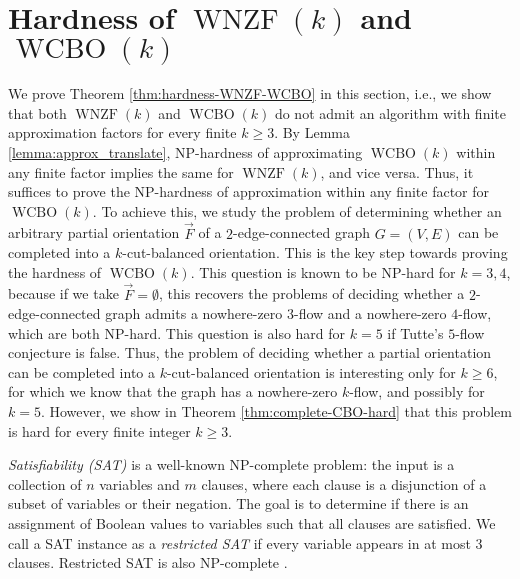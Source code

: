 \documentclass[11pt]{article}
\begin{document}
\section{Hardness of $\operatorname{WNZF}(k)$ and $\operatorname{WCBO}(k)$}\label{sec:complexity-WNZF+WCBO}
We prove Theorem \ref{thm:hardness-WNZF-WCBO} in this section, i.e., we show that both $\operatorname{WNZF}(k)$ and $\operatorname{WCBO}(k)$ do not admit an algorithm with finite approximation factors for every finite $k\geq 3$.
By Lemma \ref{lemma:approx_translate}, NP-hardness of approximating $\operatorname{WCBO}(k)$ within any finite factor implies the same for $\operatorname{WNZF}(k)$, and vice versa.
Thus, it suffices to prove the NP-hardness of approximation within any finite factor for $\operatorname{WCBO}(k)$.
To achieve this, we study the problem of determining whether an arbitrary partial orientation $\vec{F}$ of a $2$-edge-connected graph $G=(V,E)$ can be completed into a $k$-cut-balanced orientation. This is the key step towards proving the hardness of $\operatorname{WCBO}(k)$. This question is known to be NP-hard for $k=3,4$, because if we take $\vec{F}=\emptyset$, this recovers the problems of deciding whether a $2$-edge-connected graph admits a nowhere-zero $3$-flow and a nowhere-zero $4$-flow, which are both NP-hard. This question is also hard for $k=5$ if Tutte's $5$-flow conjecture is false. Thus, the problem of deciding whether a partial orientation can be completed into a $k$-cut-balanced orientation is interesting only for $k\geq 6$, for which we know that the graph has a nowhere-zero $k$-flow, and possibly for $k=5$. However, we show in Theorem \ref{thm:complete-CBO-hard} that this problem is hard for every finite integer $k\geq 3$.

\emph{Satisfiability (SAT)} is a well-known NP-complete problem: the input is a collection of $n$ variables and $m$ clauses, where each clause is a disjunction of a subset of variables or their negation. The goal is to determine if there is an assignment of Boolean values to variables such that all clauses are satisfied. We call a SAT instance as a \emph{restricted SAT} if every variable appears in at most $3$ clauses. Restricted SAT is also NP-complete \cite{tovey1984simplified}.
\end{document}
